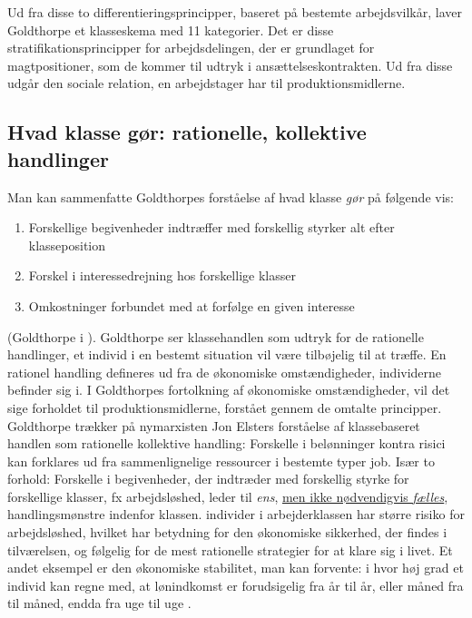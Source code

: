 Ud fra disse to differentieringsprincipper, baseret på bestemte arbejdsvilkår, laver Goldthorpe et klasseskema med 11 kategorier. Det er disse stratifikationsprincipper for arbejdsdelingen, der er grundlaget for magtpositioner, som de kommer til udtryk i ansættelseskontrakten. Ud fra disse udgår den sociale relation, en arbejdstager har til produktionsmidlerne. %

\label{klasse egp11}

%
\subsection{Hvad klasse gør: rationelle, kollektive handlinger \label{subsec_}}
%

Man kan sammenfatte Goldthorpes forståelse af hvad klasse \emph{gør} på følgende vis: 
%
\begin{enumerate}
 \itemsep-0.3em 		
 	\item Forskellige begivenheder indtræffer med forskellig styrker alt efter klasseposition
 	\item Forskel i interessedrejning hos forskellige klasser
 	\item Omkostninger forbundet med at forfølge en given interesse
\end{enumerate}
%
(Goldthorpe i \parencite[93]{Harrits2014}). Goldthorpe ser klassehandlen som  udtryk for de rationelle handlinger, et individ i en bestemt situation vil være tilbøjelig til at træffe. En rationel handling defineres ud fra de økonomiske omstændigheder, individerne befinder sig i. I Goldthorpes fortolkning af økonomiske omstændigheder, vil det sige forholdet til produktionsmidlerne, forstået gennem de omtalte principper. Goldthorpe trækker på nymarxisten Jon Elsters forståelse af klassebaseret handlen som rationelle kollektive handling: Forskelle i belønninger kontra risici kan forklares ud fra sammenlignelige ressourcer i bestemte typer job. Især to forhold: Forskelle i begivenheder, der indtræder med forskellig styrke for forskellige klasser, fx arbejdsløshed, leder til \emph{ens}, \underline{men ikke nødvendigvis \emph{fælles}}, handlingsmønstre indenfor klassen. individer i arbejderklassen har større risiko for arbejdsløshed, hvilket har betydning for den økonomiske sikkerhed, der findes i tilværelsen, og følgelig for de mest rationelle strategier for at klare sig i livet. Et andet eksempel er den økonomiske stabilitet, man kan forvente: i hvor høj grad et individ kan regne med, at lønindkomst er forudsigelig fra år til år, eller måned fra til måned, endda fra uge til uge \parencite[6, 10]{GoldthorpeMcKnight2004}.


